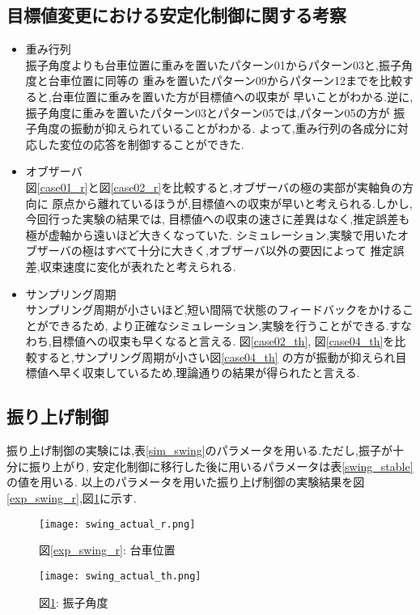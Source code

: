\subsection{目標値変更における安定化制御に関する考察}
\begin{itemize}
    \item 重み行列 \\
        振子角度よりも台車位置に重みを置いたパターン01からパターン03と,振子角度と台車位置に同等の
        重みを置いたパターン09からパターン12までを比較すると,台車位置に重みを置いた方が目標値への収束が
        早いことがわかる.逆に,振子角度に重みを置いたパターン03とパターン05では,パターン05の方が
        振子角度の振動が抑えられていることがわかる.
        よって,重み行列の各成分に対応した変位の応答を制御することができた.
    \item オブザーバ \\
        図\ref{case01_r}と図\ref{case02_r}を比較すると,オブザーバの極の実部が実軸負の方向に
        原点から離れているほうが,目標値への収束が早いと考えられる.しかし,今回行った実験の結果では,
        目標値への収束の速さに差異はなく,推定誤差も極が虚軸から遠いほど大きくなっていた.
        シミュレーション,実験で用いたオブザーバの極はすべて十分に大きく,オブザーバ以外の要因によって
        推定誤差,収束速度に変化が表れたと考えられる.
    \item サンプリング周期 \\
        サンプリング周期が小さいほど,短い間隔で状態のフィードバックをかけることができるため,
        より正確なシミュレーション,実験を行うことができる.すなわち,目標値への収束も早くなると言える.
        図\ref{case02_th}, 図\ref{case04_th}を比較すると,サンプリング周期が小さい図\ref{case04_th}
        の方が振動が抑えられ目標値へ早く収束しているため,理論通りの結果が得られたと言える.
\end{itemize}


\subsection{振り上げ制御}
振り上げ制御の実験には,表\ref{sim_swing}のパラメータを用いる.ただし,振子が十分に振り上がり,
安定化制御に移行した後に用いるパラメータは表\ref{swing_stable}の値を用いる.
以上のパラメータを用いた振り上げ制御の実験結果を図\ref{exp_swing_r},図\ref{exp_swing_th}に示す.

\begin{figure}[htbp]
    \begin{minipage}{0.5\hsize}
        \begin{center}
            \texttt{[image: swing\_actual\_r.png]}
            \caption{図\ref{exp_swing_r}: 台車位置}
            \label{exp_swing_r}
        \end{center}
    \end{minipage}
    \begin{minipage}{0.5\hsize}
        \begin{center}
            \texttt{[image: swing\_actual\_th.png]}
            \caption{図\ref{exp_swing_th}: 振子角度}
            \label{exp_swing_th}
        \end{center}
    \end{minipage}
\end{figure}

